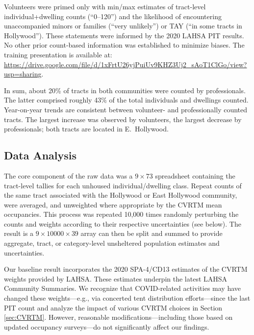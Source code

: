 \documentclass[11pt,twocolumn]{article}
\begin{document}
Volunteers were primed only with min/max estimates of tract-level individual+dwelling counts 
(``0--120'') and the likelihood of encountering unaccompanied minors or families (``very unlikely'')
or TAY (``in some tracts in Hollywood''). These statements were informed by the 2020 LAHSA PIT 
results. No other prior count-based information was established to minimize biases. The training 
presentation is available at: \url{https://drive.google.com/file/d/1xFrtU26yjPuiUv9KHZ3Uj2_sAoT1ClGo/view?usp=sharing}.

In sum, about 20\% of tracts in both communities were counted by professionals. The latter comprised
roughly 43\% of the total individuals and dwellings counted. Year-on-year trends are consistent between
volunteer- and professionally counted tracts. The largest increase was observed by volunteers, the largest
decrease by professionals; both tracts are located in E.~Hollywood.

\subsection{Data Analysis}
\label{sec:analysis}

The core component of the raw data was a $9\times73$ spreadsheet containing the
tract-level tallies for each unhoused individual/dwelling class. Repeat counts of the same
tract associated with the Hollywood or East Hollywood community, were averaged, and
unweighted where appropriate by the CVRTM mean occupancies. This process was repeated 
10,000 times randomly perturbing the counts and weights according to their respective 
uncertainties (see below). The result is a $9\times10000\times39$ array can then 
be split and summed to provide aggregate, tract, or category-level unsheltered
population estimates and uncertainties.

Our baseline result incorporates the 2020 SPA-4/CD13 estimates of the CVRTM weights provided
by LAHSA. These estimates underpin the latest LAHSA Community Summaries. We recognize 
that COVID-related activities may have changed these weights---e.g., via concerted tent distribution
efforts---since the last PIT count and analyze the impact of various CVRTM choices in 
Section \ref{sec:CVRTM}. However, reasonable modifications---including those based on updated
occupancy surveys---do not significantly affect our findings.

\end{document}
